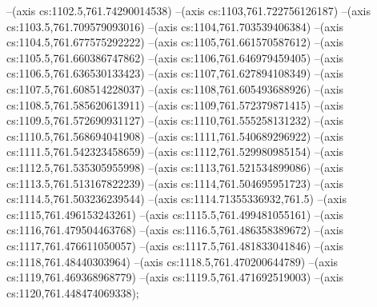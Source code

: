 --(axis cs:1102.5,761.74290014538)
--(axis cs:1103,761.722756126187)
--(axis cs:1103.5,761.709579093016)
--(axis cs:1104,761.703539406384)
--(axis cs:1104.5,761.677575292222)
--(axis cs:1105,761.661570587612)
--(axis cs:1105.5,761.660386747862)
--(axis cs:1106,761.646979459405)
--(axis cs:1106.5,761.636530133423)
--(axis cs:1107,761.627894108349)
--(axis cs:1107.5,761.608514228037)
--(axis cs:1108,761.605493688926)
--(axis cs:1108.5,761.585620613911)
--(axis cs:1109,761.572379871415)
--(axis cs:1109.5,761.572690931127)
--(axis cs:1110,761.555258131232)
--(axis cs:1110.5,761.568694041908)
--(axis cs:1111,761.540689296922)
--(axis cs:1111.5,761.542323458659)
--(axis cs:1112,761.529980985154)
--(axis cs:1112.5,761.535305955998)
--(axis cs:1113,761.521534899086)
--(axis cs:1113.5,761.513167822239)
--(axis cs:1114,761.504695951723)
--(axis cs:1114.5,761.503236239544)
--(axis cs:1114.71355336932,761.5)
--(axis cs:1115,761.496153243261)
--(axis cs:1115.5,761.499481055161)
--(axis cs:1116,761.479504463768)
--(axis cs:1116.5,761.486358389672)
--(axis cs:1117,761.476611050057)
--(axis cs:1117.5,761.481833041846)
--(axis cs:1118,761.48440303964)
--(axis cs:1118.5,761.470200644789)
--(axis cs:1119,761.469368968779)
--(axis cs:1119.5,761.471692519003)
--(axis cs:1120,761.448474069338);

